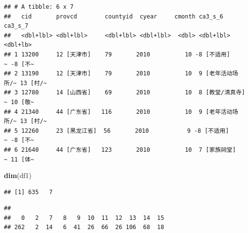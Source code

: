 \documentclass[
  oneside]{book}
\newenvironment{Shaded}{\begin{snugshade}}{\end{snugshade}}
\newcommand{\DecValTok}[1]{\textcolor[rgb]{0.00,0.00,0.81}{#1}}
\newcommand{\FunctionTok}[1]{\textcolor[rgb]{0.13,0.29,0.53}{\textbf{#1}}}
\newcommand{\NormalTok}[1]{#1}
\newcommand{\OtherTok}[1]{\textcolor[rgb]{0.56,0.35,0.01}{#1}}
\newcommand{\SpecialCharTok}[1]{\textcolor[rgb]{0.81,0.36,0.00}{\textbf{#1}}}
\begin{document}
\begin{verbatim}
## # A tibble: 6 x 7
##   cid       provcd        countyid  cyear     cmonth ca3_s_6            ca3_s_7 
##   <dbl+lbl> <dbl+lbl>     <dbl+lbl> <dbl+lbl>  <dbl> <dbl+lbl>          <dbl+lb>
## 1 13200     12 [天津市]    79       2010          10 -8 [不适用]      ~ -8 [不~
## 2 13190     12 [天津市]    79       2010          10  9 [老年活动场所/~ 13 [村/~
## 3 12780     14 [山西省]    69       2010          10  8 [教堂/清真寺] ~ 10 [敬~
## 4 21340     44 [广东省]   116       2010          10  9 [老年活动场所/~ 13 [村/~
## 5 12260     23 [黑龙江省]  56       2010           9 -8 [不适用]      ~ -8 [不~
## 6 21640     44 [广东省]   123       2010          10  7 [家族祠堂]    ~ 11 [体~
\end{verbatim}

\begin{Shaded}
\begin{Highlighting}[]
\FunctionTok{dim}\NormalTok{(df1)}
\end{Highlighting}
\end{Shaded}

\begin{verbatim}
## [1] 635   7
\end{verbatim}

\begin{Shaded}
\end{Shaded}

\begin{verbatim}
## 
##   0   2   7   8   9  10  11  12  13  14  15 
## 262   2  14   6  41  26  66  26 106  68  18
\end{verbatim}

\begin{Shaded}
\end{Shaded}
\end{document}
